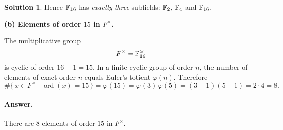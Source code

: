 \documentclass[12pt]{article}
\theoremstyle{definition} %
\newtheorem{solution}{Solution}
\theoremstyle{plain} %
\begin{document}
\begin{solution}
            Hence $\Bbb F_{16}$ has \emph{exactly three} subfields:
            $\Bbb F_{2}$, $\Bbb F_{4}$ and $\Bbb F_{16}$.
            
            \bigskip
            \noindent\textbf{(b)  Elements of order $15$ in $F^{\times}$.}
            
            The multiplicative group
            \[
               F^{\times}=\Bbb F_{16}^{\times}
            \]
            is cyclic of order $16-1=15$.  
            In a finite cyclic group of order $n$, the number of elements of exact
            order $n$ equals Euler’s totient
            \(
               \varphi(n).
            \)
            Therefore
            \[
               \#\{\,x\in F^{\times}\mid\operatorname{ord}(x)=15\,\}
                  =\varphi(15)
                  =\varphi(3)\,\varphi(5)
                  =(3-1)(5-1)
                  =2\cdot4
                  =8.
            \]
            
            \paragraph{Answer.}
            There are $\boxed{8}$ elements of order $15$ in $F^{\times}$.
            \end{solution}
\end{document}
